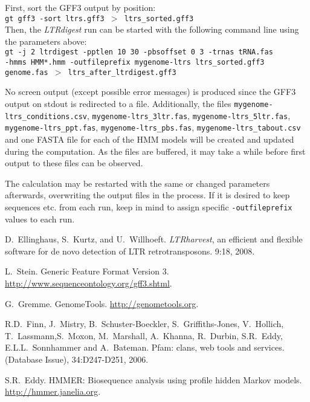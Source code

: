 \documentclass[12pt,titlepage]{article}
\newcommand{\LTRdigest}{\textit{LTRdigest}\xspace}
\begin{document}
First, sort the GFF3 output by position:
\\[0.5cm]
\texttt{gt gff3 -sort ltrs.gff3 $>$ ltrs\_sorted.gff3}
\\[0.5cm]
Then, the \LTRdigest run can be started with the following command line using the parameters above:
\\[0.5cm]
\texttt{gt -j 2 ltrdigest -pptlen 10 30 -pbsoffset 0 3 -trnas tRNA.fas \\-hmms HMM*.hmm -outfileprefix mygenome-ltrs ltrs\_sorted.gff3 genome.fas $>$ ltrs\_after\_ltrdigest.gff3}

No screen output (except possible error messages) is produced since the GFF3 output on stdout is redirected to a file. Additionally, the files \texttt{mygenome\--ltrs\_conditions.csv}, \texttt{mygenome\--ltrs\_3ltr.fas}, \texttt{mygenome\--ltrs\_5ltr.fas}, \texttt{mygenome\--ltrs\_ppt.fas}, \texttt{mygenome\--ltrs\_pbs.fas}, \texttt{mygenome-\-ltrs\_tabout.csv} and one FASTA file for each of the HMM models will be created and updated during the computation. As the files are buffered, it may take a while before first output to these files can be observed.

The calculation may be restarted with the same or changed parameters afterwards, overwriting the output files in the process. If it is desired to keep sequences etc. from each run, keep in mind to assign specific \texttt{-outfileprefix} values to each run.


\begin{thebibliography}{1}

D.~Ellinghaus, S.~Kurtz, and U.~Willhoeft.
\newblock \emph{LTRharvest}, an efficient and flexible software for de novo
  detection of \normalsize{LTR} retrotransposons.
 9:18, 2008.

L.~Stein.
\newblock Generic Feature Format Version 3.
  \url{http://www.sequenceontology.org/gff3.shtml}.

G.~Gremme.
\newblock GenomeTools.
  \url{http://genometools.org}.

R.D.~Finn, J.~Mistry, B.~Schuster-Boeckler, S.~Griffiths-Jones, V.~Hollich, T.~Lassmann,S.~Moxon, M.~Marshall, A.~Khanna, R.~Durbin, S.R.~Eddy, E.L.L.~Sonnhammer and A.~Bateman.
\newblock  Pfam: clans, web tools and services.
 (Database Issue), 34:D247-D251, 2006.

S.R.~Eddy.
\newblock HMMER: Biosequence analysis using profile hidden Markov models.
  \url{http://hmmer.janelia.org}.


\end{thebibliography}
\end{document}
